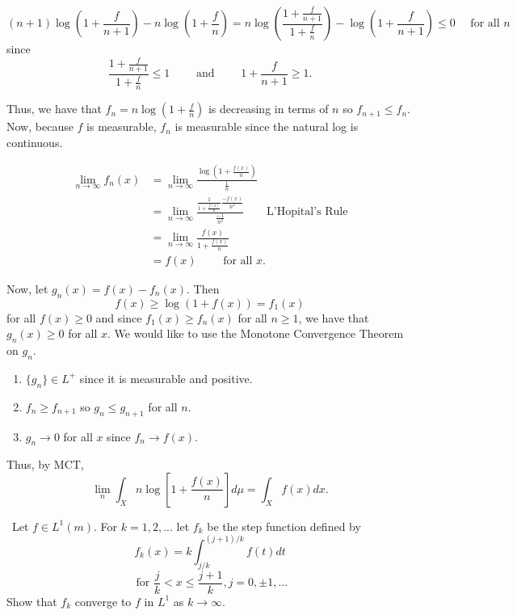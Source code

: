 \documentclass[12pt]{Qual}
\begin{document}
\begin{solution}$\,$
$$(n+1)\log\left(1+\frac{f}{n+1}\right)-n\log\left(1+\frac{f}{n}\right)=n\log\left(\frac{1+\frac{f}{n+1}}{1+\frac{f}{n}}\right)-\log\left(1+\frac{f}{n+1}\right)\le0\quad\text{ for all }n$$ since $$\frac{1+\frac{f}{n+1}}{1+\frac{f}{n}}\le 1\qquad\text{ and }\qquad1+\frac{f}{n+1}\ge 1.$$

Thus, we have that $f_n=n\log\left(1+\frac{f}{n}\right)$ is decreasing in terms of $n$ so $f_{n+1}\le f_n$. Now, because $f$ is measurable, $f_n$ is measurable since the natural log is continuous.

\begin{align*}
    \lim_{n\to\infty}f_n(x)&=\lim_{n\to\infty}\frac{\log\left(1+\frac{f(x)}{n}\right)}{\frac{1}{n}}\\
    &=\lim_{n\to\infty}\frac{\frac{1}{1+\frac{f(x)}{n}}\frac{-f(x)}{n^2}}{\frac{-1}{n^2}}\qquad\text{L'Hopital's Rule}\\
    &=\lim_{n\to\infty}\frac{f(x)}{1+\frac{f(x)}{n}}\\
    &=f(x)\qquad\text{ for all }x.
\end{align*}

Now, let $g_n(x)=f(x)-f_n(x).$ Then $$f(x)\ge \log(1+f(x))=f_1(x)$$ for all $f(x)\ge0$ and since $f_1(x)\ge f_n(x)$ for all $n\ge1$, we have that $g_n(x)\ge0$ for all $x$. We would like to use the Monotone Convergence Theorem on $g_n$.
\begin{enumerate}
    \item $\{g_n\}\in L^+$ since it is measurable and positive.
    \item $f_n\ge f_{n+1}$ so $g_n\le g_{n+1}$ for all $n$.
    \item $g_n\to 0$ for all $x$ since $f_n\to f(x)$.
\end{enumerate}

Thus, by MCT, $$\lim_n\int_X n\log\left[1+\frac{f(x)}{n}\right]d\mu=\int_Xf(x)dx.$$
\end{solution}
\newpage

\begin{problem} $\,$
Let $f\in L^1(m).$ For $k=1,2,...$ let $f_k$ be the step function defined by $$f_k(x)=k\int_{j/k}^{(j+1)/k}f(t)dt$$ $$\text{ for }\frac{j}{k}<x\le\frac{j+1}{k},j=0,\pm1,...$$
Show that $f_k$ converge to $f$ in $L^1$ as $k\to\infty$.
\end{problem}
\end{document}
